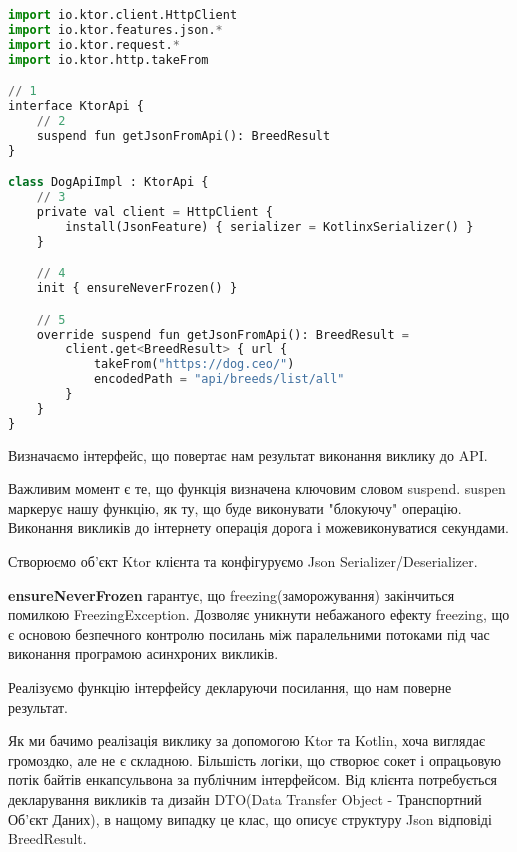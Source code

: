 \begin{lstlisting}[style=light, language=Python,label={lst:kmm_ktor},caption=Ktor]
import io.ktor.client.HttpClient
import io.ktor.features.json.*
import io.ktor.request.*
import io.ktor.http.takeFrom

// 1
interface KtorApi {
    // 2
    suspend fun getJsonFromApi(): BreedResult
}

class DogApiImpl : KtorApi {
    // 3
    private val client = HttpClient {
        install(JsonFeature) { serializer = KotlinxSerializer() }
    }

    // 4
    init { ensureNeverFrozen() }

    // 5
    override suspend fun getJsonFromApi(): BreedResult =
        client.get<BreedResult> { url {
            takeFrom("https://dog.ceo/")
            encodedPath = "api/breeds/list/all"
        }
    }
}
\end{lstlisting}

\begin{enumerate}
    \begin{item}
        Визначаємо інтерфейс, що повертає нам результат виконання виклику до API.
    \end{item}

    \begin{item}
        Важливим момент є те, що функція визначена ключовим словом suspend.
        suspen маркерує нашу функцію, як ту, що буде виконувати "блокуючу" операцію.
        Виконання викликів до інтернету операція дорога і можевиконуватися секундами.
    \end{item}

    \begin{item}
        Створюємо об'єкт Ktor клієнта та конфігуруємо Json Serializer/Deserializer.
    \end{item}

    \begin{item}
        \textbf{ensureNeverFrozen} гарантує, що freezing(заморожування) закінчиться помилкою FreezingException.
        Дозволяє уникнути небажаного ефекту freezing, що є основою безпечного контролю посилань між паралельними потоками
        під час виконання програмою асинхроних викликів.
    \end{item}

    \begin{item}
        Реалізуємо функцію інтерфейсу декларуючи посилання, що нам поверне результат.
    \end{item}

\end{enumerate}

Як ми бачимо реалізація виклику за допомогою Ktor та Kotlin, хоча виглядає громоздко, але не є складною.
Більшість логіки, що створює сокет і опрацьовую потік байтів енкапсульвона за публічним інтерфейсом.
Від клієнта потребується декларування викликів та дизайн DTO(Data Transfer Object - Транспортний Об'єкт Даних),
в нащому випадку це клас, що описує структуру Json відповіді BreedResult.
